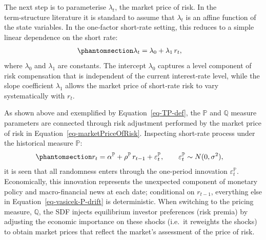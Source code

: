 \documentclass[
  letterpaper,
  DIV=11,
  numbers=noendperiod]{scrreprt}
\begin{document}
The next step is to parameterise \(\lambda_t\), the market price of
risk. In the term‑structure literature it is standard to assume that
\(\lambda_t\) is an affine function of the state variables. In the
one‑factor short-rate setting, this reduces to a simple linear
dependence on the short rate:
\begin{equation}\protect\phantomsection\label{eq-marketPriceOfRisk}{
\begin{align}
    \lambda_t &= \lambda_0 + \lambda_1 \, r_t,
\end{align}
}\end{equation} where \(\lambda_0\) and \(\lambda_1\) are constants. The
intercept \(\lambda_0\) captures a level component of risk compensation
that is independent of the current interest‑rate level, while the slope
coefficient \(\lambda_1\) allows the market price of short‑rate risk to
vary systematically with \(r_t\).

As shown above and exemplified by Equation~\ref{eq-TP-def}, the
\(\mathbb{P}\) and \(\mathbb{Q}\) measure parameters are connected
through risk adjustment performed by the market price of risk in
Equation~\ref{eq-marketPriceOfRisk}. Inspecting short-rate process under
the historical measure \(\mathbb{P}\):
\begin{equation}\protect\phantomsection\label{eq-vasicek-P-drift}{
\begin{align}
    r_t &= \alpha^{\mathbb{P}} + \rho^{\mathbb{P}} \, r_{t-1} 
            + \varepsilon_t^{\mathbb{P}}, \qquad
            \varepsilon_t^{\mathbb{P}} \sim N(0,\sigma^2),
\end{align}
}\end{equation} it is seen that all randomness enters through the
one-period innovation \(\varepsilon_t^{\mathbb{P}}\). Economically, this
innovation represents the unexpected component of monetary policy and
macro-financial news at each date; conditional on \(r_{t-1}\),
everything else in Equation~\ref{eq-vasicek-P-drift} is deterministic.
When switching to the pricing measure, \(\mathbb{Q}\), the SDF injects
equilibrium investor preferences (risk premia) by adjusting the economic
importance on these shocks (i.e.~it reweights the shocks) to obtain
market prices that reflect the market's assessment of the price of risk.
\end{document}
